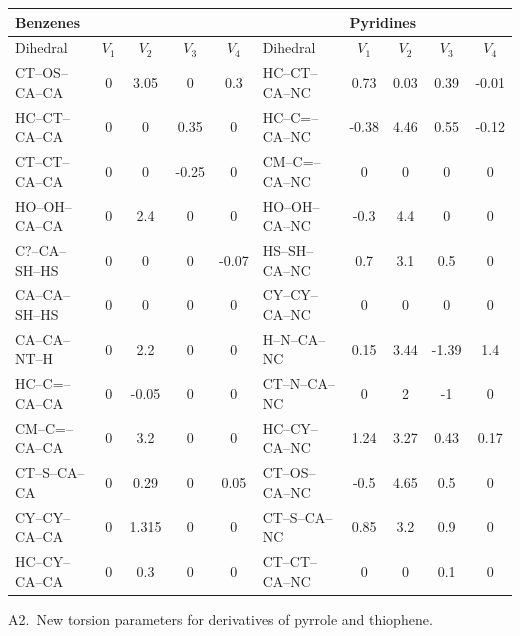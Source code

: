 \documentclass[12pt]{report}
\begin{document}
\begin{table}[ht]
\footnotesize
\begin{tabular}{lcccc|lcccc}
\toprule
\multicolumn{4}{l}{\hspace*{3.25cm}Benzenes} &&& \multicolumn{4}{l}{\hspace*{0.25cm}Pyridines} \\
\midrule
Dihedral & $V_1$ & $V_2$ & $V_3$ & $V_4$ & Dihedral & $V_1$ & $V_2$ & $V_3$ & $V_4$\\
\midrule
CT--OS--CA--CA & 0 & 3.05 & 0 & 0.3 & HC--CT--CA--NC & 0.73 & 0.03 & 0.39 & -0.01\\
HC--CT--CA--CA & 0 & 0 & 0.35 & 0 & HC--C=--CA--NC & -0.38 & 4.46 & 0.55 & -0.12\\
CT--CT--CA--CA & 0 & 0 & -0.25 & 0 & CM--C=--CA--NC & 0 & 0 & 0 & 0\\
HO--OH--CA--CA & 0 & 2.4 & 0 & 0 & HO--OH--CA--NC & -0.3 & 4.4 & 0 & 0\\
C?--CA--SH--HS & 0 & 0 & 0 & -0.07 & HS--SH--CA--NC & 0.7 & 3.1 & 0.5 & 0\\
CA--CA--SH--HS & 0 & 0 & 0 & 0 & CY--CY--CA--NC & 0 & 0 & 0 & 0\\
CA--CA--NT--H & 0 & 2.2 & 0 & 0 & H--N--CA--NC & 0.15 & 3.44 & -1.39 & 1.4\\
HC--C=--CA--CA & 0 & -0.05 & 0 & 0 & CT--N--CA--NC & 0 & 2 & -1 & 0\\
CM--C=--CA--CA & 0 & 3.2 & 0 & 0 & HC--CY--CA--NC & 1.24 & 3.27 & 0.43 & 0.17\\
CT--S--CA--CA & 0 & 0.29 & 0 & 0.05 & CT--OS--CA--NC & -0.5 & 4.65 & 0.5 & 0\\
CY--CY--CA--CA & 0 & 1.315 & 0 & 0 & CT--S--CA--NC & 0.85 & 3.2 & 0.9 & 0\\
HC--CY--CA--CA & 0 & 0.3 & 0 & 0 & CT--CT--CA--NC & 0 & 0 & 0.1 & 0\\
\bottomrule
\end{tabular}
\end{table}

\noindent A2.\ New torsion parameters for derivatives of pyrrole and thiophene.
\end{document}
